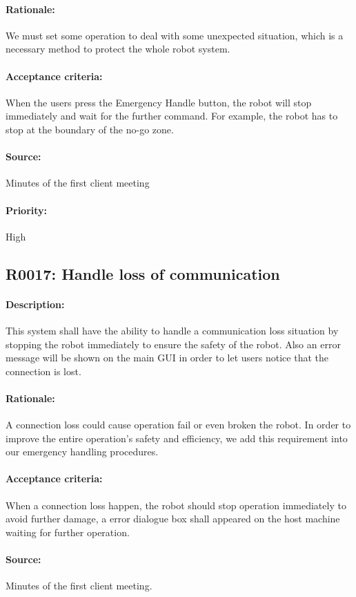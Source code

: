 \documentclass[11pt, a4paper]{report}
\begin{document}
\paragraph{Rationale:}
We must set some operation to deal with some unexpected situation, which is a necessary method to protect the whole robot system. 
\paragraph{Acceptance criteria:}
When the users press the Emergency Handle button, the robot will stop immediately and wait for the further command. For example, the robot has to stop at the boundary of the no-go zone. 
\paragraph{Source:}
 Minutes of the first client meeting 
\paragraph{Priority:}
High  


\subsection{R0017: Handle loss of communication}
\paragraph{Description:}
This system shall have the ability to handle a communication loss situation by stopping the robot immediately to ensure the safety of the robot. Also an error message will be shown on the main GUI in order to let users notice that the connection is lost. 
\paragraph{Rationale:}
A connection loss could cause operation fail or even broken the robot. In order to improve the entire operation's safety and efficiency, we add this requirement into our emergency handling procedures. 
\paragraph{Acceptance criteria:}
When a connection loss happen, the robot should stop operation immediately to avoid further damage, a error dialogue box shall appeared on the host machine waiting for further operation.
\paragraph{Source:}
Minutes of the first client meeting.
\end{document}
